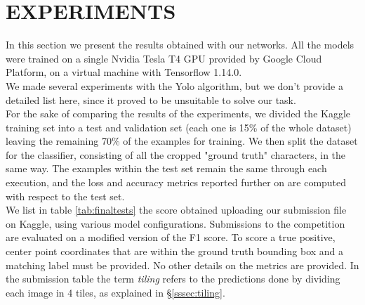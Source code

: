 \section{EXPERIMENTS}
\label{sec:experiments}

In this section we present the results obtained with our networks. All the models were trained on a single Nvidia Tesla T4 GPU provided by Google Cloud Platform, on a virtual machine with Tensorflow 1.14.0. \\
We made several experiments with the Yolo algorithm, but we don't provide a detailed list here, since it proved to be unsuitable to solve our task.\\
For the sake of comparing the results of the experiments, we divided the Kaggle training set into a test and validation set (each one is 15\% of the whole dataset) leaving the remaining 70\% of the examples for training. We then split the dataset for the classifier, consisting of all the cropped "ground truth" characters, in the same way. The examples within the test set remain the same through each execution, and the loss and accuracy metrics reported further on are computed with respect to the test set.\\
We list in table \ref{tab:finaltests} the score obtained uploading our submission file on Kaggle, using various model configurations.
Submissions to the competition are evaluated on a modified version of the F1 score. To score a true positive, center point coordinates that are within the ground truth bounding box and a matching label must be provided. No other details on the metrics are provided.  In the submission table the term \textit{tiling} refers to the predictions done by dividing each image in 4 tiles, as explained in §\ref{sssec:tiling}.


